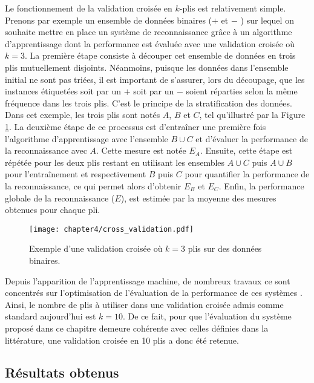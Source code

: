 Le fonctionnement de la validation croisée en $k$-plis est relativement simple. Prenons par exemple un ensemble de données binaires (\og $+$ \fg et \og $-$ \fg) sur lequel on souhaite mettre en place un système de reconnaissance grâce à un algorithme d'apprentissage dont la performance est évaluée avec une validation croisée où $k=3$. La première étape consiste à découper cet ensemble de données en trois plis mutuellement disjoints. Néanmoins, puisque les données dans l'ensemble initial ne sont pas triées, il est important de s'assurer, lors du découpage, que les instances étiquetées soit par un \og $+$ \fg soit par un \og $-$ \fg soient réparties selon la même fréquence dans les trois plis. C'est le principe de la stratification des données. Dans cet exemple, les trois plis sont notés $A$, $B$ et $C$, tel qu'illustré par la Figure \ref{fig:cross_validation}. La deuxième étape de ce processus est d'entraîner une première fois l'algorithme d'apprentissage avec l'ensemble $B\cup C$ et d'évaluer la performance de la reconnaissance avec $A$. Cette mesure est notée $E_A$. Ensuite, cette étape est répétée pour les deux plis restant en utilisant les ensembles $A\cup C$ puis $A\cup B$ pour l'entraînement et respectivement $B$ puis $C$ pour quantifier la performance de la reconnaissance, ce qui permet alors d'obtenir $E_B$ et $E_C$. Enfin, la performance globale de la reconnaissance ($E$), est estimée par la moyenne des mesures obtenues pour chaque pli.

\begin{figure}[H]
	\centering
	\texttt{[image: chapter4/cross\_validation.pdf]}
        \caption{Exemple d'une validation croisée où $k=3$ plis sur des données binaires.}
	\label{fig:cross_validation}
\end{figure}

Depuis l'apparition de l'apprentissage machine, de nombreux travaux ce sont concentrés sur l'optimisation de l'évaluation de la performance de ces systèmes \citep{Witten2016}. Ainsi, le nombre de plis à utiliser dans une validation croisée admis comme standard aujourd'hui est $k=10$. De ce fait, pour que l'évaluation du système proposé dans ce chapitre demeure cohérente avec celles définies dans la littérature, une validation croisée en 10 plis a donc été retenue.

\subsection{Résultats obtenus}

